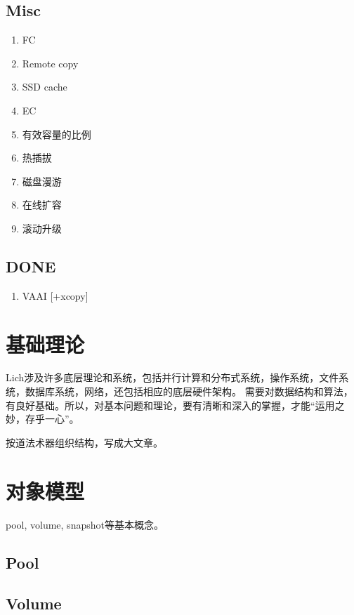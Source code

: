 \documentclass[UTF8]{ctexart}
\begin{document}
\subsection{Misc}

\begin{tcolorbox}
\begin{enumerate}
    \item FC
    \item Remote copy
    \item SSD cache
    \item EC
    \item 有效容量的比例
    \item 热插拔
    \item 磁盘漫游
    \item 在线扩容
    \item 滚动升级
\end{enumerate}
\end{tcolorbox}

\subsection{DONE}

\begin{enumerate}
    \item VAAI [+xcopy]
\end{enumerate}

\section{基础理论}

Lich涉及许多底层理论和系统，包括并行计算和分布式系统，操作系统，文件系统，数据库系统，网络，还包括相应的底层硬件架构。
需要对数据结构和算法，有良好基础。所以，对基本问题和理论，要有清晰和深入的掌握，才能“运用之妙，存乎一心”。

按道法术器组织结构，写成大文章。

\section{对象模型}

pool, volume, snapshot等基本概念。

\subsection{Pool}
\subsection{Volume}
\end{document}
